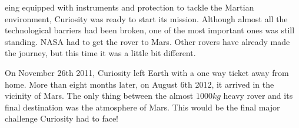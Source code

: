 eing equipped with instruments and protection to tackle the Martian environment, Curiosity was ready to start its mission.
Although almost all the technological barriers had been broken, one of the most important ones was still standing.
NASA had to get the rover to Mars.
Other rovers have already made the journey, but this time it was a little bit different.

On November 26th 2011, Curiosity left Earth with a one way ticket away from home.
More than eight months later, on August 6th 2012, it arrived in the vicinity of Mars.
The only thing between the almost $1000kg$ heavy rover and its final destination was the atmosphere of Mars.
This would be the final major challenge Curiosity had to face!